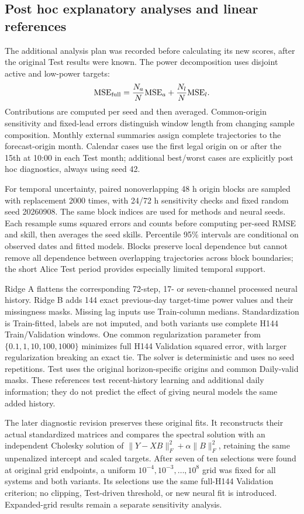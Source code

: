 \documentclass[aip,reprint,floatfix,amsmath,amssymb]{revtex4-2}
\begin{document}
\subsection{Post hoc explanatory analyses and linear references}
The additional analysis plan was recorded before calculating its new scores, after the original Test results were known. The power decomposition uses disjoint active and low-power targets:
\begin{equation}
\mathrm{MSE}_{\rm full}=\frac{N_a}{N}\mathrm{MSE}_a+\frac{N_l}{N}\mathrm{MSE}_l.
\end{equation}
Contributions are computed per seed and then averaged. Common-origin sensitivity and fixed-lead errors distinguish window length from changing sample composition. Monthly external summaries assign complete trajectories to the forecast-origin month. Calendar cases use the first legal origin on or after the 15th at 10:00 in each Test month; additional best/worst cases are explicitly post hoc diagnostics, always using seed 42.

For temporal uncertainty, paired nonoverlapping 48 h origin blocks are sampled with replacement 2000 times, with 24/72 h sensitivity checks and fixed random seed 20260908. The same block indices are used for methods and neural seeds. Each resample sums squared errors and counts before computing per-seed RMSE and skill, then averages the seed skills. Percentile 95\% intervals are conditional on observed dates and fitted models. Blocks preserve local dependence but cannot remove all dependence between overlapping trajectories across block boundaries; the short Alice Test period provides especially limited temporal support.

Ridge A flattens the corresponding 72-step, 17- or seven-channel processed neural history. Ridge B adds 144 exact previous-day target-time power values and their missingness masks. Missing lag inputs use Train-column medians. Standardization is Train-fitted, labels are not imputed, and both variants use complete H144 Train/Validation windows. One common regularization parameter from $\{0.1,1,10,100,1000\}$ minimizes full H144 Validation squared error, with larger regularization breaking an exact tie. The solver is deterministic and uses no seed repetitions. Test uses the original horizon-specific origins and common Daily-valid masks. These references test recent-history learning and additional daily information; they do not predict the effect of giving neural models the same added history.

The later diagnostic revision preserves these original fits. It reconstructs their actual standardized matrices and compares the spectral solution with an independent Cholesky solution of $\|Y-XB\|_F^2+\alpha\|B\|_F^2$, retaining the same unpenalized intercept and scaled targets. After seven of ten selections were found at original grid endpoints, a uniform $10^{-4},10^{-3},\ldots,10^8$ grid was fixed for all systems and both variants. Its selections use the same full-H144 Validation criterion; no clipping, Test-driven threshold, or new neural fit is introduced. Expanded-grid results remain a separate sensitivity analysis.
\end{document}
